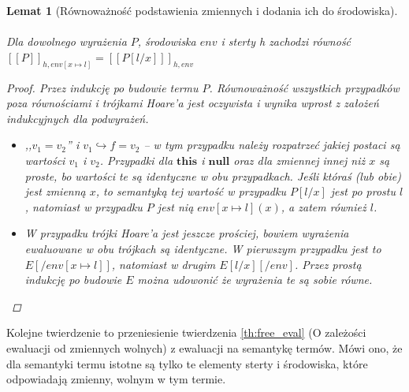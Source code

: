 \documentclass[]{pracamgr}
\renewcommand \| {\hspace{0.75em} | \hspace{0.75em} }
\renewcommand \[ {[\![}
\renewcommand \] {]\!]}
\newtheorem{lemma}{Lemat}
\theoremstyle{definition}
\newcommand{\jnull}{\mathbf{null}\xspace}
\newcommand{\jthis}{\textbf{this}\xspace}
\begin{document}
\begin{lemma}[Równoważność podstawienia zmiennych i dodania ich do środowiska] {\ } \\
Dla dowolnego wyrażenia $P$, środowiska $env$ i sterty h zachodzi równość
$\[ P \]_{h, env[x \mapsto l]} = \[ P[l / x] \]_{h, env}$
\begin{proof}
Przez indukcję po budowie termu $P$.
Równoważność wszystkich przypadków poza równościami i trójkami Hoare'a jest oczywista i
wynika wprost z założeń indukcyjnych dla podwyrażeń.
\begin{itemize}
 \item ,,$v_1 = v_2$'' i $v_1 \hookrightarrow f = v_2$ -- w tym przypadku należy rozpatrzeć
 jakiej postaci są wartości $v_1$ i $v_2$. Przypadki dla $\jthis$ i $\jnull$ oraz
 dla zmiennej innej niż $x$ są proste, bo wartości te są identyczne w obu przypadkach.
 Jeśli któraś (lub obie) jest zmienną $x$, to semantyką tej wartość w przypadku $P[l/x]$
 jest po prostu $l$, natomiast w przypadku $P$ jest nią $env[x \mapsto l](x)$,
 a zatem również $l$.
 \item W przypadku trójki Hoare'a jest jeszcze prościej, bowiem wyrażenia ewaluowane
 w obu trójkach są identyczne.
 W pierwszym przypadku jest to $E[/env[x \mapsto l]]$, natomiast w drugim
 $E[l / x][/env]$. Przez prostą indukcję po budowie $E$ można udowonić że wyrażenia te są
 sobie równe.
\end{itemize}
\end{proof}
\end{lemma}

Kolejne twierdzenie to przeniesienie twierdzenia \ref{th:free_eval} (O zależości ewaluacji
od zmiennych wolnych)
z ewaluacji na semantykę termów. Mówi ono, że dla semantyki termu istotne są tylko te
elementy sterty i środowiska, które odpowiadają zmienny, wolnym w tym termie.
\end{document}

